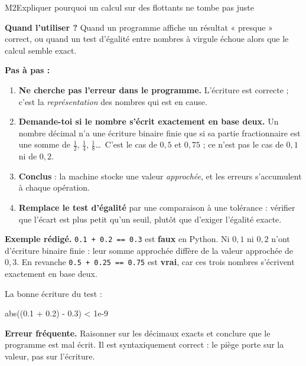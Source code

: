 \begin{fichemethode}{M2}{Expliquer pourquoi un calcul sur des flottants ne tombe pas juste}

\textbf{Quand l'utiliser ?} Quand un programme affiche un résultat « presque » correct, ou
quand un test d'égalité entre nombres à virgule échoue alors que le calcul semble exact.

\textbf{Pas à pas :}
\begin{enumerate}
  \item \textbf{Ne cherche pas l'erreur dans le programme.} L'écriture est correcte ; c'est la
        \emph{représentation} des nombres qui est en cause.
  \item \textbf{Demande-toi si le nombre s'écrit exactement en base deux.} Un nombre décimal
        n'a une écriture binaire finie que si sa partie fractionnaire est une somme de
        $\frac{1}{2}$, $\frac{1}{4}$, $\frac{1}{8}$\ldots\ C'est le cas de $0{,}5$ et
        $0{,}75$ ; ce n'est pas le cas de $0{,}1$ ni de $0{,}2$.
  \item \textbf{Conclus} : la machine stocke une valeur \emph{approchée}, et les erreurs
        s'accumulent à chaque opération.
  \item \textbf{Remplace le test d'égalité} par une comparaison à une tolérance :
        vérifier que l'écart est plus petit qu'un seuil, plutôt que d'exiger l'égalité exacte.
\end{enumerate}

\textbf{Exemple rédigé.} \lstinline{0.1 + 0.2 == 0.3} est \textbf{faux} en Python. Ni
$0{,}1$ ni $0{,}2$ n'ont d'écriture binaire finie : leur somme approchée diffère de la valeur
approchée de $0{,}3$. En revanche \lstinline{0.5 + 0.25 == 0.75} est \textbf{vrai}, car ces
trois nombres s'écrivent exactement en base deux.

La bonne écriture du test :
\begin{python}
abs((0.1 + 0.2) - 0.3) < 1e-9
\end{python}

\textbf{Erreur fréquente.} Raisonner sur les décimaux exacts et conclure que le programme est
mal écrit. Il est syntaxiquement correct : le piège porte sur la valeur, pas sur l'écriture.

\end{fichemethode}
